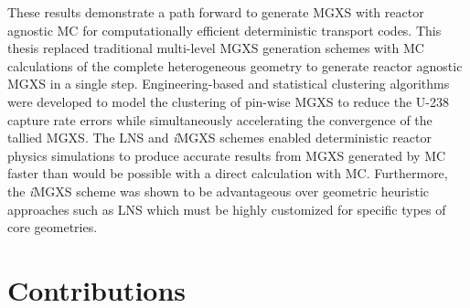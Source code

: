 These results demonstrate a path forward to generate \ac{MGXS} with reactor agnostic \ac{MC} for computationally efficient deterministic transport codes. This thesis replaced traditional multi-level \ac{MGXS} generation schemes with \ac{MC} calculations of the complete heterogeneous geometry to generate reactor agnostic \ac{MGXS} in a single step. Engineering-based and statistical clustering algorithms were developed to model the clustering of pin-wise \ac{MGXS} to reduce the U-238 capture rate errors while simultaneously accelerating the convergence of the tallied \ac{MGXS}. The \ac{LNS} and \textit{i}\ac{MGXS} schemes enabled deterministic reactor physics simulations to produce accurate results from \ac{MGXS} generated by \ac{MC} faster than would be possible with a direct calculation with \ac{MC}. Furthermore, the \textit{i}\ac{MGXS} scheme was shown to be advantageous over geometric heuristic approaches such as \ac{LNS} which must be highly customized for specific types of core geometries.



\clearpage

\section{Contributions}
\label{sec:chap12-contributions}



